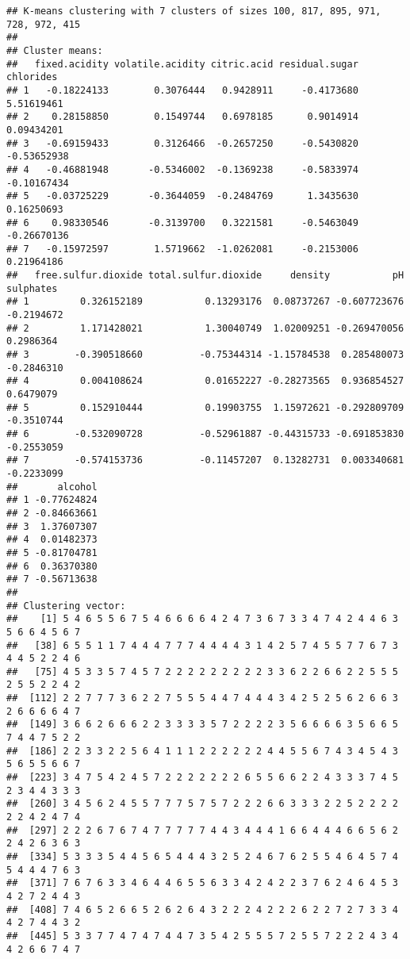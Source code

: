 \documentclass[
]{article}
\begin{document}
\begin{verbatim}
## K-means clustering with 7 clusters of sizes 100, 817, 895, 971, 728, 972, 415
## 
## Cluster means:
##   fixed.acidity volatile.acidity citric.acid residual.sugar   chlorides
## 1   -0.18224133        0.3076444   0.9428911     -0.4173680  5.51619461
## 2    0.28158850        0.1549744   0.6978185      0.9014914  0.09434201
## 3   -0.69159433        0.3126466  -0.2657250     -0.5430820 -0.53652938
## 4   -0.46881948       -0.5346002  -0.1369238     -0.5833974 -0.10167434
## 5   -0.03725229       -0.3644059  -0.2484769      1.3435630  0.16250693
## 6    0.98330546       -0.3139700   0.3221581     -0.5463049 -0.26670136
## 7   -0.15972597        1.5719662  -1.0262081     -0.2153006  0.21964186
##   free.sulfur.dioxide total.sulfur.dioxide     density           pH  sulphates
## 1         0.326152189           0.13293176  0.08737267 -0.607723676 -0.2194672
## 2         1.171428021           1.30040749  1.02009251 -0.269470056  0.2986364
## 3        -0.390518660          -0.75344314 -1.15784538  0.285480073 -0.2846310
## 4         0.004108624           0.01652227 -0.28273565  0.936854527  0.6479079
## 5         0.152910444           0.19903755  1.15972621 -0.292809709 -0.3510744
## 6        -0.532090728          -0.52961887 -0.44315733 -0.691853830 -0.2553059
## 7        -0.574153736          -0.11457207  0.13282731  0.003340681 -0.2233099
##       alcohol
## 1 -0.77624824
## 2 -0.84663661
## 3  1.37607307
## 4  0.01482373
## 5 -0.81704781
## 6  0.36370380
## 7 -0.56713638
## 
## Clustering vector:
##    [1] 5 4 6 5 5 6 7 5 4 6 6 6 6 4 2 4 7 3 6 7 3 3 4 7 4 2 4 4 6 3 5 6 6 4 5 6 7
##   [38] 6 5 5 1 1 7 4 4 4 7 7 7 4 4 4 4 3 1 4 2 5 7 4 5 5 7 7 6 7 3 4 4 5 2 2 4 6
##   [75] 4 5 3 3 5 7 4 5 7 2 2 2 2 2 2 2 2 2 3 3 6 2 2 6 6 2 2 5 5 5 2 5 5 2 2 4 2
##  [112] 2 2 7 7 7 3 6 2 2 7 5 5 5 4 4 7 4 4 4 3 4 2 5 2 5 6 2 6 6 3 2 6 6 6 6 4 7
##  [149] 3 6 6 2 6 6 6 2 2 3 3 3 3 5 7 2 2 2 2 3 5 6 6 6 6 3 5 6 6 5 7 4 4 7 5 2 2
##  [186] 2 2 3 3 2 2 5 6 4 1 1 1 2 2 2 2 2 2 4 4 5 5 6 7 4 3 4 5 4 3 5 6 5 5 6 6 7
##  [223] 3 4 7 5 4 2 4 5 7 2 2 2 2 2 2 2 6 5 5 6 6 2 2 4 3 3 3 7 4 5 2 3 4 4 3 3 3
##  [260] 3 4 5 6 2 4 5 5 7 7 7 5 7 5 7 2 2 2 6 6 3 3 3 2 2 5 2 2 2 2 2 2 4 2 4 7 4
##  [297] 2 2 2 6 7 6 7 4 7 7 7 7 7 4 4 3 4 4 4 1 6 6 4 4 4 6 6 5 6 2 2 4 2 6 3 6 3
##  [334] 5 3 3 3 5 4 4 5 6 5 4 4 4 3 2 5 2 4 6 7 6 2 5 5 4 6 4 5 7 4 5 4 4 4 7 6 3
##  [371] 7 6 7 6 3 3 4 6 4 4 6 5 5 6 3 3 4 2 4 2 2 3 7 6 2 4 6 4 5 3 4 2 7 2 4 4 3
##  [408] 7 4 6 5 2 6 6 5 2 6 2 6 4 3 2 2 2 4 2 2 2 6 2 2 7 2 7 3 3 4 4 2 7 4 4 3 2
##  [445] 5 3 3 7 7 4 7 4 7 4 4 7 3 5 4 2 5 5 5 7 2 5 5 7 2 2 2 4 3 4 4 2 6 6 7 4 7

\end{verbatim}
\end{document}
